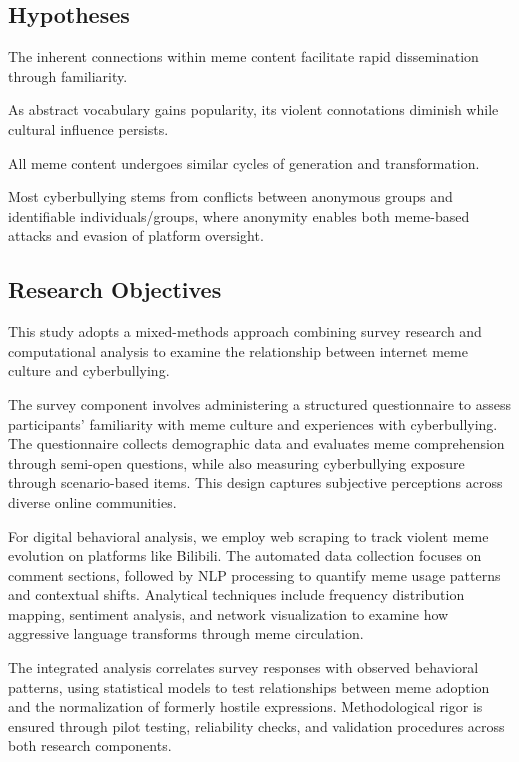 \documentclass[12pt,a4paper]{ctexart}
\theoremstyle{MyLineTheoremStyle}
\theoremstyle{MyBlockTheoremStyle}
\theoremstyle{MySubsubsectionStyle}
\begin{document}
\subsection{Hypotheses}

The inherent connections within meme content facilitate rapid dissemination through familiarity.

As abstract vocabulary gains popularity, its violent connotations diminish while cultural influence persists.

All meme content undergoes similar cycles of generation and transformation.

Most cyberbullying stems from conflicts between anonymous groups and identifiable individuals/groups, where anonymity enables both meme-based attacks and evasion of platform oversight.

\subsection{Research Objectives}

This study adopts a mixed-methods approach combining survey research and computational analysis to examine the relationship between internet meme culture and cyberbullying.

The survey component involves administering a structured questionnaire to assess participants' familiarity with meme culture and experiences with cyberbullying. The questionnaire collects demographic data and evaluates meme comprehension through semi-open questions, while also measuring cyberbullying exposure through scenario-based items. This design captures subjective perceptions across diverse online communities.

For digital behavioral analysis, we employ web scraping to track violent meme evolution on platforms like Bilibili. The automated data collection focuses on comment sections, followed by NLP processing to quantify meme usage patterns and contextual shifts. Analytical techniques include frequency distribution mapping, sentiment analysis, and network visualization to examine how aggressive language transforms through meme circulation.

The integrated analysis correlates survey responses with observed behavioral patterns, using statistical models to test relationships between meme adoption and the normalization of formerly hostile expressions. Methodological rigor is ensured through pilot testing, reliability checks, and validation procedures across both research components.
\end{document}
